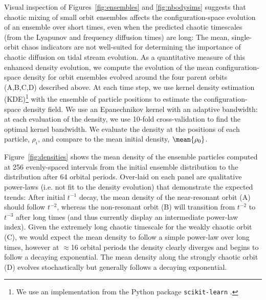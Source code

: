 Visual inspection of Figures~\ref{fig:ensembles} and \ref{fig:nbodysims}
suggests that chaotic mixing of small orbit ensembles affects the
configuration-space evolution of an ensemble over short times, even when the
predicted chaotic timescales (from the Lyapunov and frequency diffusion times)
are long: The mean, single-orbit chaos indicators are not well-suited for
determining the importance of chaotic diffusion on tidal stream evolution. As a
quantitative measure of this enhanced density evolution, we compute the
evolution of the mean configuration-space density for orbit ensembles evolved
around the four parent orbits (A,B,C,D) described above. At each time step, we
use kernel density estimation (KDE)\footnote{We use an implementation from the
Python package \texttt{scikit-learn} \citep{scikitlearn}.} with the ensemble of
particle positions to estimate the configuration-space density field. We use an
Epanechnikov kernel with an adaptive bandwidth: at each evaluation of the
density, we use 10-fold cross-validation to find the optimal kernel bandwidth.
We evaluate the density at the positions of each particle, $\rho_i$, and compare
to the mean initial density, $\mean{\rho_0}$.

Figure~\ref{fig:densities} shows the mean density of the ensemble particles
computed at 256 evenly-spaced intervals from the initial ensemble distribution
to the distribution after 64 orbital periods. Over-laid on each panel are
qualitative power-laws (i.e. not fit to the density evolution) that demonstrate
the expected trends: After initial $t^{-1}$ decay, the mean density of the
near-resonant orbit (A) should follow $t^{-2}$, whereas the non-resonant orbit
(B) will transition from $t^{-2}$ to $t^{-3}$ after long times (and thus
currently display an intermediate power-law index). Given the extremely long
chaotic timescale for the weakly chaotic orbit (C), we would expect the mean
density to follow a simple power-law over long times, however at $\approx$16
orbital periods the density clearly diverges and begins to follow a decaying
exponential. The mean density along the strongly chaotic orbit (D) evolves
stochastically but generally follows a decaying exponential.

